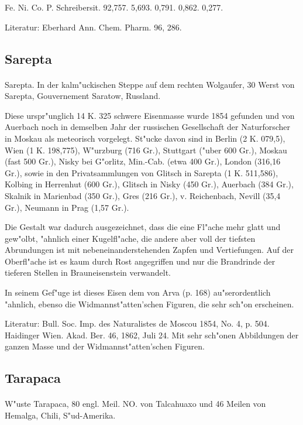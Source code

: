 \documentclass[a4paper, 11pt, oneside]{article}
\begin{document}
Fe. Ni. Co. P. Schreibersit.  
92,757. 5,693. 0,791. 0,862. 0,277.

Literatur: Eberhard Ann. Chem. Pharm. 96, 286.

\subsection{Sarepta}
\normalsize
\paragraph{}
Sarepta. In der kalm"uckischen Steppe auf dem rechten Wolgaufer, 30 Werst von Sarepta, Gouvernement Saratow, Russland.

Diese urspr"unglich 14 K. 325 schwere Eisenmasse wurde 1854 gefunden und von Auerbach noch in demselben Jahr der russischen Gesellschaft der Naturforscher in Moskau als meteorisch vorgelegt. St"ucke davon sind in Berlin (2 K. 079,5), Wien (1 K. 198,775), W"urzburg (716 Gr.), Stuttgart ("uber 600 Gr.), Moskau (fast 500 Gr.), Nisky bei G"orlitz, Min.-Cab. (etwa 400 Gr.), London (316,16 Gr.), sowie in den Privatsammlungen von Glitsch in Sarepta (1 K. 511,586), Kolbing in Herrenhut (600 Gr.), Glitsch in Nisky (450 Gr.), Auerbach (384 Gr.), Skalnik in Marienbad (350 Gr.), Gres (216 Gr.), v. Reichenbach, Nevill (35,4 Gr.), Neumann in Prag (1,57 Gr.).

Die Gestalt war dadurch ausgezeichnet, dass die eine Fl"ache mehr glatt und gew"olbt, "ahnlich einer Kugelfl"ache, die andere aber voll der tiefsten Abrundungen ist mit nebeneinanderstehenden Zapfen und Vertiefungen. Auf der Oberfl"ache ist es kaum durch Rost angegriffen und nur die Brandrinde der tieferen Stellen in Brauneisenstein verwandelt.

In seinem Gef"uge ist dieses Eisen dem von Arva (p. 168) au"serordentlich "ahnlich, ebenso die Widmannst"atten'schen Figuren, die sehr sch"on erscheinen.

Literatur: Bull. Soc. Imp. des Naturalistes de Moscou 1854, No. 4, p. 504. Haidinger Wien. Akad. Ber. 46, 1862, Juli 24. Mit sehr sch"onen Abbildungen der ganzen Masse und der Widmannst"atten'schen Figuren.

\subsection{Tarapaca}
\normalsize
\paragraph{}
W"uste Tarapaca, 80 engl. Meil. NO. von Talcahuaxo und 46 Meilen von Hemalga, Chili, S"ud-Amerika.
\end{document}
